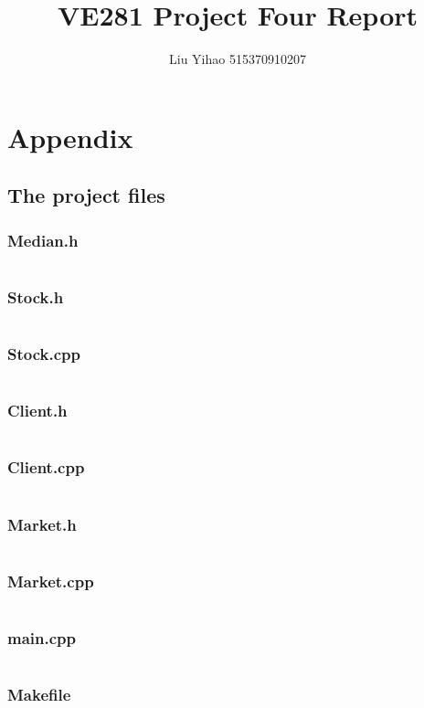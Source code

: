 \documentclass{article}
\title{VE281 Project Four Report}
\author{Liu Yihao 515370910207}
\date{}
\begin{document}
\maketitle

\section{Appendix}

\subsection{The project files}

\subsubsection{Median.h}
\inputminted{c++}{../answer/Median.h}
\subsubsection{Stock.h}
\inputminted{c++}{../answer/Stock.h}
\subsubsection{Stock.cpp}
\inputminted{c++}{../answer/Stock.cpp}
\subsubsection{Client.h}
\inputminted{c++}{../answer/Client.h}
\subsubsection{Client.cpp}
\inputminted{c++}{../answer/Client.cpp}
\subsubsection{Market.h}
\inputminted{c++}{../answer/Market.h}
\subsubsection{Market.cpp}
\inputminted{c++}{../answer/Market.cpp}
\subsubsection{main.cpp}
\inputminted{c++}{../answer/main.cpp}
\subsubsection{Makefile}
\inputminted{makefile}{../answer/Makefile}
\end{document}
